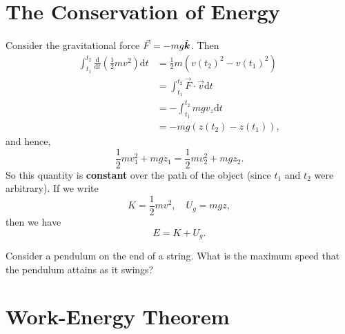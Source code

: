 \documentclass[../newtonian_mechanics.tex]{subfiles}
\begin{document}
    \section{The Conservation of Energy}

        \paragraph{}
        Consider the gravitational force $\vec{F}=-mg\hat{\boldsymbol{k}}$. Then
        \begin{align}
            \int_{t_1}^{t_2}\frac{\mathrm{d}}{\mathrm{d}t}\left(\frac{1}{2}mv^2\right)\mathrm{d}t&=\frac{1}{2}m(v(t_2)^2-v(t_1)^2)\\
            &=\int_{t_1}^{t_2}\vec{F}\cdot\vec{v}\mathrm{d}t\\
            &=-\int_{t_1}^{t_2}mgv_z\mathrm{d}t\\
            &=-mg(z(t_2)-z(t_1)),
        \end{align}
        and hence,
        \begin{equation}
            \frac{1}{2}mv_1^2+mgz_1=\frac{1}{2}mv_2^2+mgz_2.
        \end{equation}
        So this quantity is \textbf{constant} over the path of the object (since $t_1$ and $t_2$ were arbitrary).
        If we write
        \begin{equation}
            K=\frac{1}{2}mv^2, \quad U_g=mgz,
        \end{equation}
        then we have
        \begin{equation}
            E=K+U_g.
        \end{equation}
        \begin{example}
            Consider a pendulum on the end of a string. What is the maximum speed that the pendulum attains as it swings?
        \end{example}

    \section{Work-Energy Theorem}
\end{document}
